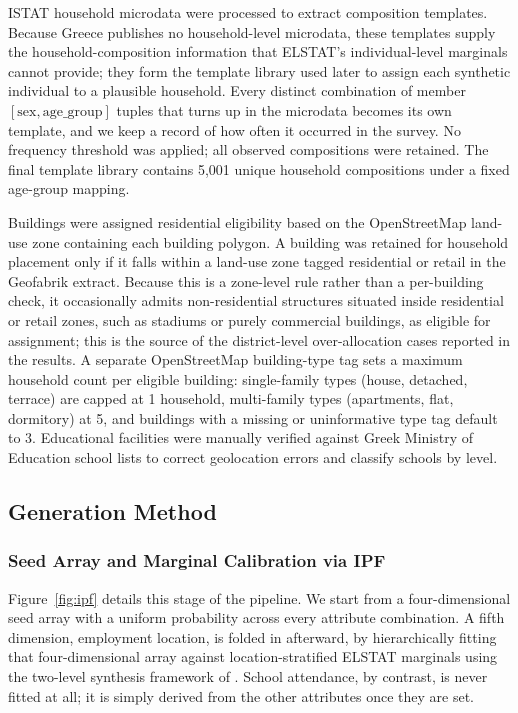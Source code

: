 \documentclass{article}
\begin{document}
ISTAT household microdata were processed to extract composition templates. Because Greece publishes no household-level microdata, these templates supply the household-composition information that ELSTAT's individual-level marginals cannot provide; they form the template library used later to assign each synthetic individual to a plausible household. Every distinct combination of member $[\text{sex}, \text{age\_group}]$ tuples that turns up in the microdata becomes its own template, and we keep a record of how often it occurred in the survey. No frequency threshold was applied; all observed compositions were retained. The final template library contains 5,001 unique household compositions under a fixed age-group mapping.

Buildings were assigned residential eligibility based on the OpenStreetMap land-use zone containing each building polygon. A building was retained for household placement only if it falls within a land-use zone tagged residential or retail in the Geofabrik extract. Because this is a zone-level rule rather than a per-building check, it occasionally admits non-residential structures situated inside residential or retail zones, such as stadiums or purely commercial buildings, as eligible for assignment; this is the source of the district-level over-allocation cases reported in the results. A separate OpenStreetMap building-type tag sets a maximum household count per eligible building: single-family types (house, detached, terrace) are capped at 1 household, multi-family types (apartments, flat, dormitory) at 5, and buildings with a missing or uninformative type tag default to 3. Educational facilities were manually verified against Greek Ministry of Education school lists to correct geolocation errors and classify schools by level.

\subsection{Generation Method}\label{generation-method}

\subsubsection{Seed Array and Marginal Calibration via IPF}\label{seed-array-and-marginal-calibration-via-ipf}

Figure~\ref{fig:ipf} details this stage of the pipeline. We start from a four-dimensional seed array with a uniform probability across every attribute combination. A fifth dimension, employment location, is folded in afterward, by hierarchically fitting that four-dimensional array against location-stratified ELSTAT marginals using the two-level synthesis framework of \citet{Muller2011HIPF}. School attendance, by contrast, is never fitted at all; it is simply derived from the other attributes once they are set.
\end{document}
